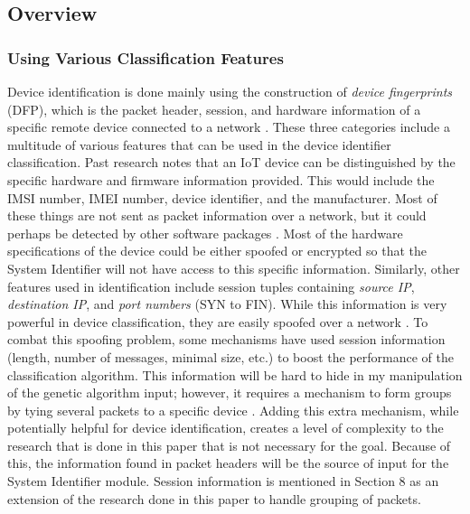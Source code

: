 \documentclass[11pt, titlepage]{article}
\begin{document}
	\subsection{Overview}
		\subsubsection{Using Various Classification Features}
			Device identification is done mainly using the construction of \textit{device fingerprints} (DFP), which is the packet header, session, and hardware information of a specific remote device connected to a network \cite{Network}. These three categories include a multitude of various features that can be used in the device identifier classification. Past research notes that an IoT device can be distinguished by the specific hardware and firmware information provided. This would include the IMSI number, IMEI number, device identifier, and the manufacturer. Most of these things are not sent as packet information over a network, but it could perhaps be detected by other software packages \cite{Privacy}. Most of the hardware specifications of the device could be either spoofed or encrypted so that the System Identifier will not have access to this specific information. Similarly, other features used in identification include session tuples containing \textit{source IP}, \textit{destination IP}, and \textit{port numbers} (SYN to FIN). While this information is very powerful in device classification, they are easily spoofed over a network \cite{Profolit}. To combat this spoofing problem, some mechanisms have used session information (length, number of messages, minimal size, etc.) to boost the performance of the classification algorithm. This information will be hard to hide in my manipulation of the genetic algorithm input; however, it requires a mechanism to form groups by tying several packets to a specific device \cite{Profolit}. Adding this extra mechanism, while potentially helpful for device identification, creates a level of complexity to the research that is done in this paper that is not necessary for the goal. Because of this, the information found in packet headers will be the source of input for the System Identifier module. Session information is mentioned in Section 8 as an extension of the research done in this paper to handle grouping of packets.
			
\end{document}
